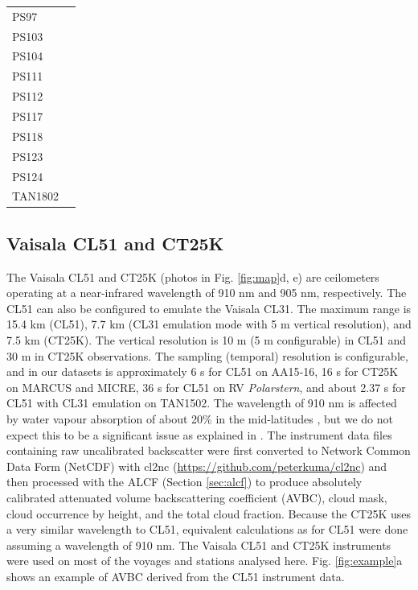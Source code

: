 \documentclass[12pt,a4paper]{article}
\begin{document}
\begin{table}[t!]
\begin{tabular}{lp{14.5cm}}
PS97     & \cite{kniglanglo2016f,kniglanglo2016g,kniglanglo2016h,kniglanglo2016i,lamy2017} \\
PS103    & \cite{kniglanglo2017a,kniglanglo2017b,kniglanglo2017c,kniglanglo2017d,boebel2018} \\
PS104    & \cite{kniglanglo2017e,kniglanglo2017f,kniglanglo2017g,gohl2018,schmithsen2021a} \\
PS111    & \cite{schmithsen2019a,schmithsen2020a,schmithsen2021b,schmithsen2021c,schrder2018} \\
PS112    & \cite{schmithsen2019b,schmithsen2020b,schmithsen2021d,schmithsen2021e,meyer2018} \\
PS117    & \cite{schmithsen2019c,schmithsen2020c,schmithsen2021f,schmithsen2021g,boebel2019} \\
PS118    & \cite{schmithsen2019d,schmithsen2020d,schmithsen2021h,schmithsen2021i,dorschel2019} \\
PS123    & \cite{schmithsen2021j,schmithsen2021m,schmithsen2021n,schmithsen2021k,hoppmann2023} \\
PS124    & \cite{schmithsen2021o,schmithsen2021q,schmithsen2021p,hoppmann2023} \\
TAN1802  & \cite{kremser2020,kremser2021} \\
\end{tabular}
\end{table}

\subsection{Vaisala CL51 and CT25K}
\label{sec:cl51}

The Vaisala CL51 and CT25K (photos in Fig. \ref{fig:map}d, e) are ceilometers
operating at a near-infrared wavelength of 910 nm and 905 nm, respectively.
The CL51 can also be configured to emulate the Vaisala CL31. The maximum range is
15.4 km (CL51), 7.7 km (CL31 emulation mode with 5 m vertical resolution), and
7.5 km (CT25K). The vertical resolution is 10 m (5 m configurable) in CL51 and
30 m in CT25K observations. The sampling (temporal) resolution is configurable, and in our
datasets is approximately 6 s for CL51 on AA15‐16, 16 s for CT25K on MARCUS and
MICRE, 36 s for CL51 on RV \emph{Polarstern}, and about 2.37 s for CL51 with
CL31 emulation on TAN1502. The wavelength of 910 nm is affected by water vapour
absorption of about 20\% in the mid-latitudes \citep{wiegner2015,wiegner2019},
but we do not expect this to be a significant issue as explained in
\cite{kuma2021}.  The instrument data files containing raw uncalibrated
backscatter were first converted to Network Common Data Form (NetCDF) with
cl2nc (\url{https://github.com/peterkuma/cl2nc}) and then processed with the
ALCF (Section \ref{sec:alcf}) to produce absolutely calibrated attenuated
volume backscattering coefficient (AVBC), cloud mask, cloud occurrence by
height, and the total cloud fraction. Because the CT25K uses a very similar
wavelength to CL51, equivalent calculations as for CL51 were done assuming a
wavelength of 910 nm. The Vaisala CL51 and CT25K instruments were used on most
of the voyages and stations analysed here. Fig.  \ref{fig:example}a shows an
example of AVBC derived from the CL51 instrument data.
\end{document}
